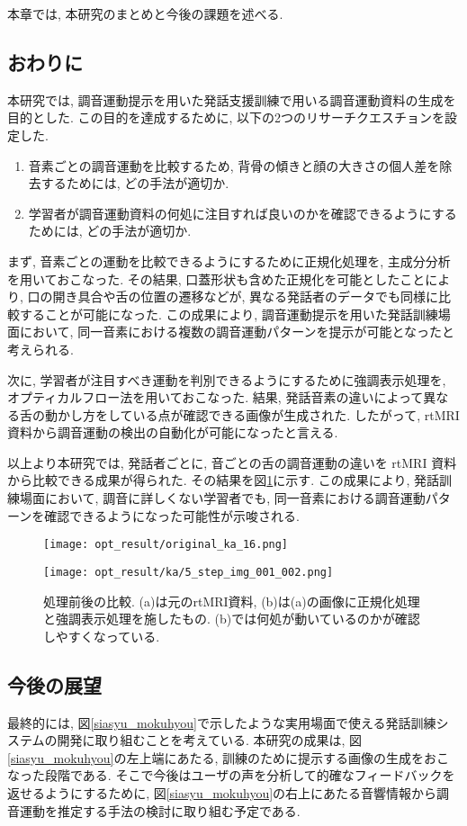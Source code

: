 本章では, 本研究のまとめと今後の課題を述べる.

\subsection{おわりに}
本研究では, 調音運動提示を用いた発話支援訓練で用いる調音運動資料の生成を目的とした. この目的を達成するために, 以下の2つのリサーチクエスチョンを設定した.

\begin{enumerate}
   \item 音素ごとの調音運動を比較するため, 背骨の傾きと顔の大きさの個人差を除去するためには, どの手法が適切か.
   \item 学習者が調音運動資料の何処に注目すれば良いのかを確認できるようにするためには, どの手法が適切か.
\end{enumerate}

まず, 音素ごとの運動を比較できるようにするために正規化処理を, 主成分分析を用いておこなった. その結果, 口蓋形状も含めた正規化を可能としたことにより, 口の開き具合や舌の位置の遷移などが, 異なる発話者のデータでも同様に比較することが可能になった. この成果により, 調音運動提示を用いた発話訓練場面において, 同一音素における複数の調音運動パターンを提示が可能となったと考えられる.

次に, 学習者が注目すべき運動を判別できるようにするために強調表示処理を, オプティカルフロー法を用いておこなった. 結果, 発話音素の違いによって異なる舌の動かし方をしている点が確認できる画像が生成された. したがって, rtMRI資料から調音運動の検出の自動化が可能になったと言える.

以上より本研究では, 発話者ごとに, 音ごとの舌の調音運動の違いを rtMRI 資料から比較できる成果が得られた. その結果を図\ref{final:result}に示す. この成果により, 発話訓練場面において, 調音に詳しくない学習者でも, 同一音素における調音運動パターンを確認できるようになった可能性が示唆される.

\begin{figure}[htbp]
  \begin{minipage}[b]{0.45\linewidth}
    \centering
    \texttt{[image: opt\_result/original\_ka\_16.png]}
    \label{result:original}
  \end{minipage}
  \begin{minipage}[b]{0.45\linewidth}
    \centering
    \texttt{[image: opt\_result/ka/5\_step\_img\_001\_002.png]}
    \label{result:final}
  \end{minipage}
  \caption[処理前後の比較]{処理前後の比較. (a)は元のrtMRI資料, (b)は(a)の画像に正規化処理と強調表示処理を施したもの. (b)では何処が動いているのかが確認しやすくなっている. }
  \label{final:result}
\end{figure}

\subsection{今後の展望}
最終的には, 図\ref{siasyu_mokuhyou}で示したような実用場面で使える発話訓練システムの開発に取り組むことを考えている.
本研究の成果は, 図\ref{siasyu_mokuhyou}の左上端にあたる, 訓練のために提示する画像の生成をおこなった段階である.
そこで今後はユーザの声を分析して的確なフィードバックを返せるようにするために, 図\ref{siasyu_mokuhyou}の右上にあたる音響情報から調音運動を推定する手法の検討に取り組む予定である.